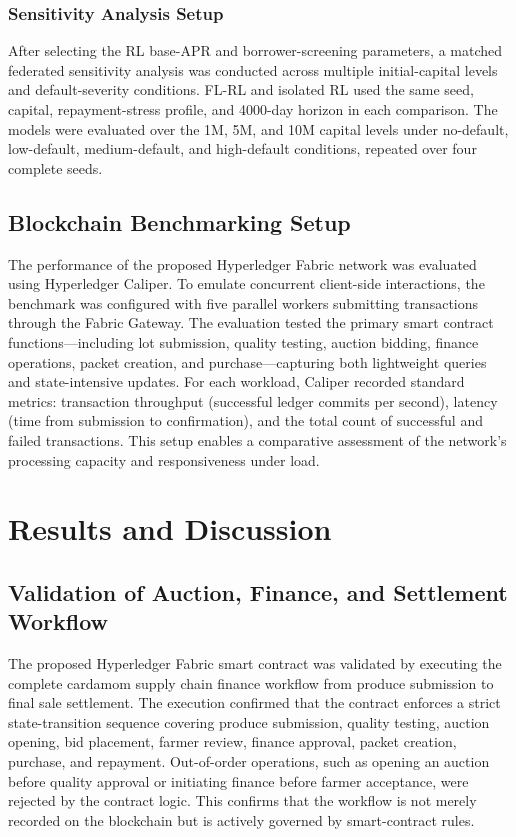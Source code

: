 \documentclass[12pt]{article}
\begin{document}
\subsubsection{Sensitivity Analysis Setup}

After selecting the RL base-APR and borrower-screening parameters, a matched federated sensitivity analysis was conducted across multiple initial-capital levels and default-severity conditions. FL-RL and isolated RL used the same seed, capital, repayment-stress profile, and 4000-day horizon in each comparison. The models were evaluated over the 1M, 5M, and 10M capital levels under no-default, low-default, medium-default, and high-default conditions, repeated over four complete seeds.

	
	
	\subsection{Blockchain Benchmarking Setup}
	
	The performance of the proposed Hyperledger Fabric network was evaluated using Hyperledger Caliper. To emulate concurrent client-side interactions, the benchmark was configured with five parallel workers submitting transactions through the Fabric Gateway. The evaluation tested the primary smart contract functions—including lot submission, quality testing, auction bidding, finance operations, packet creation, and purchase—capturing both lightweight queries and state-intensive updates. For each workload, Caliper recorded standard metrics: transaction throughput (successful ledger commits per second), latency (time from submission to confirmation), and the total count of successful and failed transactions. This setup enables a comparative assessment of the network's processing capacity and responsiveness under load.
	

	

	
	\section{Results and Discussion}

	\subsection{Validation of Auction, Finance, and Settlement Workflow}
	
	The proposed Hyperledger Fabric smart contract was validated by executing the complete cardamom supply chain finance workflow from produce submission to final sale settlement. The execution confirmed that the contract enforces a strict state-transition sequence covering produce submission, quality testing, auction opening, bid placement, farmer review, finance approval, packet creation, purchase, and repayment. Out-of-order operations, such as opening an auction before quality approval or initiating finance before farmer acceptance, were rejected by the contract logic. This confirms that the workflow is not merely recorded on the blockchain but is actively governed by smart-contract rules.
	
\end{document}
